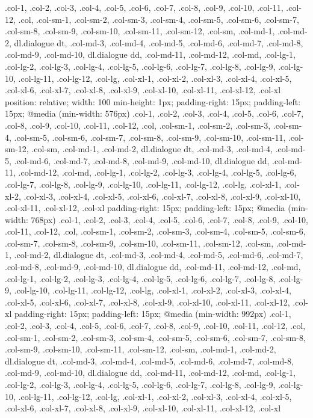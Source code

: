 {{{{{{{{{{.col-1, .col-2, .col-3, .col-4, .col-5, .col-6, .col-7, .col-8, .col-9, .col-10, .col-11, .col-12, .col, .col-sm-1, .col-sm-2, .col-sm-3, .col-sm-4, .col-sm-5, .col-sm-6, .col-sm-7, .col-sm-8, .col-sm-9, .col-sm-10, .col-sm-11, .col-sm-12, .col-sm, .col-md-1, .col-md-2, dl.dialogue dt, .col-md-3, .col-md-4, .col-md-5, .col-md-6, .col-md-7, .col-md-8, .col-md-9, .col-md-10, dl.dialogue dd, .col-md-11, .col-md-12, .col-md, .col-lg-1, .col-lg-2, .col-lg-3, .col-lg-4, .col-lg-5, .col-lg-6, .col-lg-7, .col-lg-8, .col-lg-9, .col-lg-10, .col-lg-11, .col-lg-12, .col-lg, .col-xl-1, .col-xl-2, .col-xl-3, .col-xl-4, .col-xl-5, .col-xl-6, .col-xl-7, .col-xl-8, .col-xl-9, .col-xl-10, .col-xl-11, .col-xl-12, .col-xl {
  position: relative;
  width: 100%
  min-height: 1px;
  padding-right: 15px;
  padding-left: 15px; }
  @media (min-width: 576px) {
    .col-1, .col-2, .col-3, .col-4, .col-5, .col-6, .col-7, .col-8, .col-9, .col-10, .col-11, .col-12, .col, .col-sm-1, .col-sm-2, .col-sm-3, .col-sm-4, .col-sm-5, .col-sm-6, .col-sm-7, .col-sm-8, .col-sm-9, .col-sm-10, .col-sm-11, .col-sm-12, .col-sm, .col-md-1, .col-md-2, dl.dialogue dt, .col-md-3, .col-md-4, .col-md-5, .col-md-6, .col-md-7, .col-md-8, .col-md-9, .col-md-10, dl.dialogue dd, .col-md-11, .col-md-12, .col-md, .col-lg-1, .col-lg-2, .col-lg-3, .col-lg-4, .col-lg-5, .col-lg-6, .col-lg-7, .col-lg-8, .col-lg-9, .col-lg-10, .col-lg-11, .col-lg-12, .col-lg, .col-xl-1, .col-xl-2, .col-xl-3, .col-xl-4, .col-xl-5, .col-xl-6, .col-xl-7, .col-xl-8, .col-xl-9, .col-xl-10, .col-xl-11, .col-xl-12, .col-xl {
      padding-right: 15px;
      padding-left: 15px; } }
  @media (min-width: 768px) {
    .col-1, .col-2, .col-3, .col-4, .col-5, .col-6, .col-7, .col-8, .col-9, .col-10, .col-11, .col-12, .col, .col-sm-1, .col-sm-2, .col-sm-3, .col-sm-4, .col-sm-5, .col-sm-6, .col-sm-7, .col-sm-8, .col-sm-9, .col-sm-10, .col-sm-11, .col-sm-12, .col-sm, .col-md-1, .col-md-2, dl.dialogue dt, .col-md-3, .col-md-4, .col-md-5, .col-md-6, .col-md-7, .col-md-8, .col-md-9, .col-md-10, dl.dialogue dd, .col-md-11, .col-md-12, .col-md, .col-lg-1, .col-lg-2, .col-lg-3, .col-lg-4, .col-lg-5, .col-lg-6, .col-lg-7, .col-lg-8, .col-lg-9, .col-lg-10, .col-lg-11, .col-lg-12, .col-lg, .col-xl-1, .col-xl-2, .col-xl-3, .col-xl-4, .col-xl-5, .col-xl-6, .col-xl-7, .col-xl-8, .col-xl-9, .col-xl-10, .col-xl-11, .col-xl-12, .col-xl {
      padding-right: 15px;
      padding-left: 15px; } }
  @media (min-width: 992px) {
    .col-1, .col-2, .col-3, .col-4, .col-5, .col-6, .col-7, .col-8, .col-9, .col-10, .col-11, .col-12, .col, .col-sm-1, .col-sm-2, .col-sm-3, .col-sm-4, .col-sm-5, .col-sm-6, .col-sm-7, .col-sm-8, .col-sm-9, .col-sm-10, .col-sm-11, .col-sm-12, .col-sm, .col-md-1, .col-md-2, dl.dialogue dt, .col-md-3, .col-md-4, .col-md-5, .col-md-6, .col-md-7, .col-md-8, .col-md-9, .col-md-10, dl.dialogue dd, .col-md-11, .col-md-12, .col-md, .col-lg-1, .col-lg-2, .col-lg-3, .col-lg-4, .col-lg-5, .col-lg-6, .col-lg-7, .col-lg-8, .col-lg-9, .col-lg-10, .col-lg-11, .col-lg-12, .col-lg, .col-xl-1, .col-xl-2, .col-xl-3, .col-xl-4, .col-xl-5, .col-xl-6, .col-xl-7, .col-xl-8, .col-xl-9, .col-xl-10, .col-xl-11, .col-xl-12, .col-xl {
}}}}}}}}}}}}
